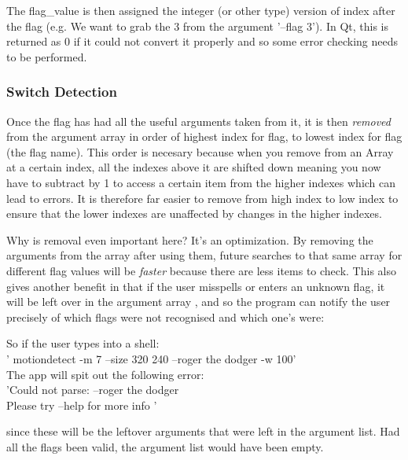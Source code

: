 \documentclass[11pt]{article} %
\begin{document}
The flag\_value is then assigned the integer (or other type) version of index after the flag (e.g. We want to grab the 3 from the argument '--flag 3'). In Qt, this is returned as 0 if it could not convert it properly and so some error checking needs to be performed.

\subsubsection{Switch Detection}
Once the flag has had all the useful arguments taken from it, it is then {\it removed} from the argument array in order of highest index for flag, to lowest index for flag (the flag name). This order is necesary because when you remove from an Array at a certain index, all the indexes above it are shifted down meaning you now have to subtract by 1 to access a certain item from the higher indexes which can lead to errors. It is therefore far easier to remove from high index to low index to ensure that the lower indexes are unaffected by changes in the higher indexes.

Why is removal even important here? It's an optimization. By removing the arguments from the array after using them, future searches to that same array for different flag values will be {\it faster} because there are less items to check. This also gives another benefit in that if the user misspells or enters an unknown flag, it will be left over in the argument array , and so the program can notify the user precisely of which flags were not recognised and which one's were:
\begin{frame}[fragile]

\end{frame}

So if the user types into a shell:\\
' motiondetect -m 7 --size 320 240 --roger the dodger -w 100'\\
The app will spit out the following error:\\
'Could not parse: --roger the dodger\\Please try --help for more info '

since these will be the leftover arguments that were left in the argument list. Had all the flags been valid, the argument list would have been empty.
\end{document}
